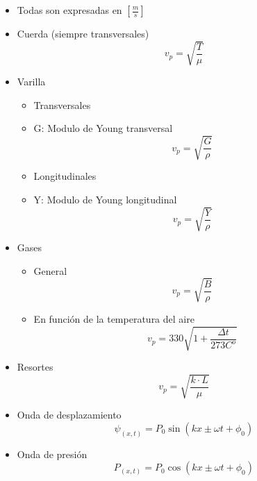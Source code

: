 \vspace{0.25cm}
\begin{itemize}
    \item Todas son expresadas en $[\frac{m}{s}]$
    \item Cuerda (siempre transversales)
    \begin{equation}
        v_p=\sqrt{\frac{T}{\mu}}
    \end{equation}
    \item Varilla
        \begin{itemize}
            \item Transversales
            \item G: Modulo de Young transversal
            \begin{equation}
                v_p=\sqrt{\frac{G}{\rho}}
            \end{equation}
            \item Longitudinales
            \item Y: Modulo de Young longitudinal
            \begin{equation}
                v_p=\sqrt{\frac{Y}{\rho}}
            \end{equation}
        \end{itemize}
    \item Gases
    \begin{itemize}
        \item General
        \begin{equation}
            v_p = \sqrt{\frac{B}{\rho}}
        \end{equation}
        \item En función de la temperatura del aire
        \begin{equation}
            v_p = 330\sqrt{1+\frac{\Delta t}{273C^o}} 
        \end{equation}
    \end{itemize}
    \item Resortes
    \begin{equation}
        v_p = \sqrt{\frac{k\cdot L}{\mu}}
    \end{equation}
\end{itemize}

\begin{itemize}
    \item Onda de desplazamiento
    \begin{equation}
        \psi_{(x,t)} = P_0 \sin(kx \pm \omega t + \phi_0)
    \end{equation}
    \item Onda de presión
    \begin{equation}
        P_{(x,t)} = P_0 \cos(kx \pm \omega t + \phi_0)
    \end{equation}
\end{itemize}

